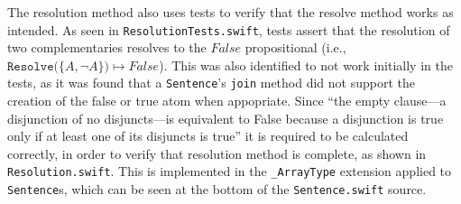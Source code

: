 The resolution method also uses tests to verify that the resolve method works as
intended. As seen in \texttt{ResolutionTests.swift}, tests assert that the resolution
of two complementaries resolves to the $False$ propositional (i.e., $\mathtt{Resolve(}\{ A, \neg A\}\mathtt{)} \mapsto False$).
This was also identified to not work initially in the tests, as it was found that
a \texttt{Sentence}'s \texttt{join} method did not support the creation of the
false or true atom when appopriate. Since ``the empty clause—a disjunction of no disjuncts—is equivalent to False because a disjunction is true only if at least one of its disjuncts is true'' \citep[p.254]{aima2009}
it is required to be calculated correctly, in order to verify that resolution
method is complete, as shown in \texttt{Resolution.swift}. This is implemented
in the \texttt{\_ArrayType} extension applied to \texttt{Sentence}s, which can
be seen at the bottom of the \texttt{Sentence.swift} source.
